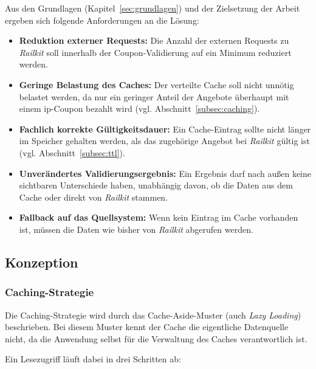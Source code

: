 Aus den Grundlagen (Kapitel~\ref{sec:grundlagen}) und der Zielsetzung der Arbeit ergeben sich folgende Anforderungen an die Lösung:

\begin{itemize}
    \item \textbf{Reduktion externer Requests:} Die Anzahl der externen Requests zu \textit{Railkit} soll innerhalb der Coupon-Validierung auf ein Minimum reduziert werden.
    \item \textbf{Geringe Belastung des Caches:} Der verteilte Cache soll nicht unnötig belastet werden, da nur ein geringer Anteil der Angebote überhaupt mit einem \ac{ip}-Coupon bezahlt wird (vgl. Abschnitt~\ref{subsec:caching}).
    \item \textbf{Fachlich korrekte Gültigkeitsdauer:} Ein Cache-Eintrag sollte nicht länger im Speicher gehalten werden, als das zugehörige Angebot bei \textit{Railkit} gültig ist (vgl. Abschnitt~\ref{subsec:ttl}).
    \item \textbf{Unverändertes Validierungsergebnis:} Ein Ergebnis darf nach außen keine sichtbaren Unterschiede haben, unabhängig davon, ob die Daten aus dem Cache oder direkt von \textit{Railkit} stammen.
    \item \textbf{Fallback auf das Quellsystem:} Wenn kein Eintrag im Cache vorhanden ist, müssen die Daten wie bisher von \textit{Railkit} abgerufen werden.
\end{itemize}

\subsection{Konzeption}
\label{subsec:konzeption}

\subsubsection{Caching-Strategie}
\label{subsubsec:strategie}

Die Caching-Strategie wird durch das Cache-Aside-Muster (auch \textit{Lazy Loading}) beschrieben. Bei diesem Muster kennt der Cache die eigentliche Datenquelle nicht, da die Anwendung selbst für die Verwaltung des Caches verantwortlich ist. %

Ein Lesezugriff läuft dabei in drei Schritten ab:

